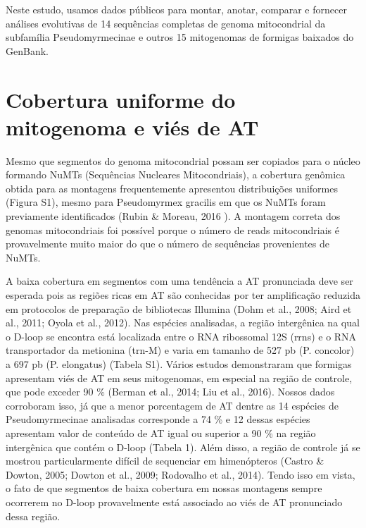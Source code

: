 \documentclass[../DISSERTACAO_MAIN.tex]{subfiles}
\begin{document}
	
	Neste estudo, usamos dados públicos para montar, anotar, comparar e fornecer análises evolutivas de 14 sequências completas de genoma mitocondrial da subfamília Pseudomyrmecinae e outros 15 mitogenomas de formigas baixados do GenBank.
	
	\section{Cobertura uniforme do mitogenoma e viés de AT}
	
	Mesmo que segmentos do genoma mitocondrial possam ser copiados para o núcleo formando NuMTs (Sequências Nucleares Mitocondriais), a cobertura genômica obtida para as montagens frequentemente apresentou distribuições uniformes (Figura S1), mesmo para Pseudomyrmex gracilis em que os NuMTs foram previamente identificados (Rubin \& Moreau, 2016 ). A montagem correta dos genomas mitocondriais foi possível porque o número de reads mitocondriais é provavelmente muito maior do que o número de sequências provenientes de NuMTs.
	
	A baixa cobertura em segmentos com uma tendência a AT pronunciada deve ser esperada pois as regiões ricas em AT são conhecidas por ter amplificação reduzida em protocolos de preparação de bibliotecas Illumina (Dohm et al., 2008; Aird et al., 2011; Oyola et al., 2012). Nas espécies analisadas, a região intergênica na qual o D-loop se encontra está localizada entre o RNA ribossomal 12S (rrns) e o RNA transportador da metionina (trn-M) e varia em tamanho de 527 pb (P. concolor) a 697 pb (P. elongatus) (Tabela S1). Vários estudos demonstraram que formigas apresentam viés de AT em seus mitogenomas, em especial na região de controle, que pode exceder 90 \% (Berman et al., 2014; Liu et al., 2016). Nossos dados corroboram isso, já que a menor porcentagem de AT dentre as 14 espécies de Pseudomyrmecinae analisadas corresponde a 74 \% e 12 dessas espécies apresentam valor de conteúdo de AT igual ou superior a 90 \% na região intergênica que contém o D-loop (Tabela 1). Além disso, a região de controle já se mostrou particularmente difícil de sequenciar em himenópteros (Castro \& Dowton, 2005; Dowton et al., 2009; Rodovalho et al., 2014). Tendo isso em vista, o fato de que segmentos de baixa cobertura em nossas montagens sempre ocorrerem no D-loop provavelmente está associado ao viés de AT pronunciado dessa região.
	
\end{document}
